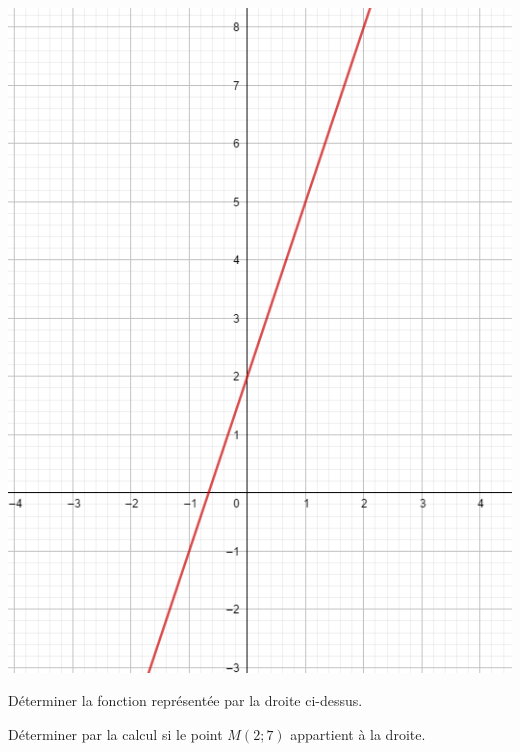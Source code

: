 \begin{center}
	\includegraphics[scale=0.5]{fct2}
	
\end{center}

\begin{questions}
	\question[2] Déterminer la fonction représentée par la droite ci-dessus.
	\fillwithdottedlines{7cm}
	
	\question[2] Déterminer par la calcul si le point $M(2; 7)$ appartient à la droite.
	
	\fillwithdottedlines{4cm}
\end{questions}